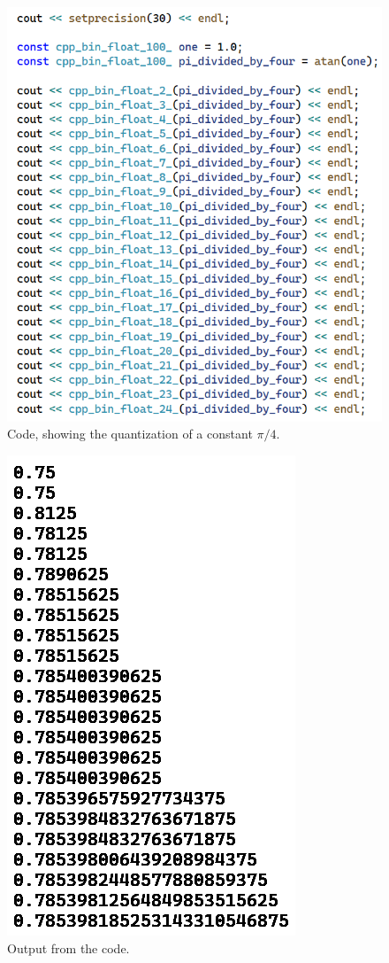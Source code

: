 \documentclass[12pt]{article}
\begin{document}
\pagebreak



\begin{figure} 
\centering
\label{fig7}
  \includegraphics[width = 4 in]{code.png}
  \caption{
Code, showing the quantization of a constant $\pi/4$.
}
\end{figure}

\begin{figure} 
\centering
\label{fig7}
  \includegraphics[width = 3 in]{code_output.png}
  \caption{
Output from the code.
}
\end{figure}
\end{document}
